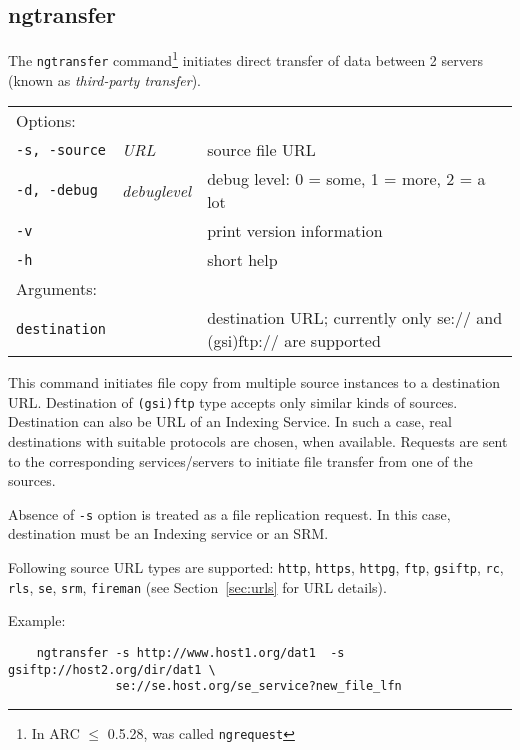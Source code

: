 \subsection{ngtransfer}\label{sec:ngtransfer}
The \texttt{ngtransfer}
command\footnote{In ARC $\leq$ 0.5.28, was called \texttt{ngrequest}}
initiates direct transfer of data between 2 servers (known as
\textit{third-party transfer}).  
\hspace*{0.5cm}
\begin{shaded}
\end{shaded}
\begin{longtable}{llp{8cm}}
   Options:&&\\
    \texttt{-s, -source} & \textit{URL} & source file URL\\
    \texttt{-d, -debug} & \textit{debuglevel} &debug level: 0 = some, 1 = more, 2 = a lot \\
    \texttt{-v} && print version information\\
    \texttt{-h} && short help\\
   Arguments:&&\\
    \texttt{destination} && destination URL; currently only se:// and
    (gsi)ftp:// are supported\\
\end{longtable}

This command initiates file copy from multiple source instances to a
destination URL. Destination of \texttt{(gsi)ftp} type accepts only
similar kinds of sources.  Destination can also be URL of an Indexing
Service. In such a case, real destinations with suitable protocols are
chosen, when available. Requests are sent to the corresponding
services/servers to initiate file transfer from one of the sources.

\begin{framed}
   Absence of \verb#-s# option is treated as a file replication
   request. In this case, destination must be an Indexing service or
   an SRM.
\end{framed}

Following source URL types are supported: \texttt{http},
\texttt{https}, \texttt{httpg}, \texttt{ftp}, \texttt{gsiftp},
\texttt{rc}, \texttt{rls}, \texttt{se}, \texttt{srm}, \texttt{fireman}
(see Section~\ref{sec:urls} for URL details).

Example:
\begin{verbatim}
    ngtransfer -s http://www.host1.org/dat1  -s gsiftp://host2.org/dir/dat1 \
               se://se.host.org/se_service?new_file_lfn
\end{verbatim}
